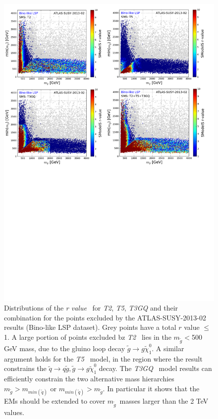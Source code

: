 \documentclass[a4paper,11pt]{article}
\newcommand{\MGLU}{$ m _{ \tilde g } $\xspace}
\newcommand{\RVALUE}{\textit{r value}}
\newcommand{\TGQ}{ \textit{T3GQ}}
\newcommand{\Ttwo}{ \textit{T2}}
\newcommand{\Tfive}{ \textit{T5}}
\begin{document}
\begin{figure}[!h]
	\begin{center}
		\includegraphics[width=1\textwidth]{PLOTS/App/Bino_Combo.pdf}
	\end{center}
	\vspace{0.2pt}
	\caption{Distributions of the \RVALUE~ for \textit{T2}, \textit{T5}, \textit{T3GQ} and their combination for the points excluded by the ATLAS-SUSY-2013-02 results (Bino-like LSP dataset). Grey points have a total $r$ value $\leq$ 1. A large portion of points excluded bz \Ttwo~ lies in the $m_{\tilde g}<$500 GeV mass, due to the gluino loop decay $\tilde g \rightarrow g \tilde \chi _1 ^0$. A similar argument holds for the \Tfive~ model, in the region where the result constrains the $\tilde q \rightarrow q \tilde g, \tilde g \rightarrow  g \tilde \chi _1 ^0$ decay. The \TGQ~ model results can efficiently constrain the two alternative mass hierarchies $m_{\tilde g}>m_{min(\tilde q)}$ or $m_{min(\tilde q)}>m_{\tilde g }$. In particular it shows that the EMs should be extended to cover \MGLU~masses larger than the 2 TeV values.}
	\label{rvalues-bino}
\end{figure}
\end{document}
